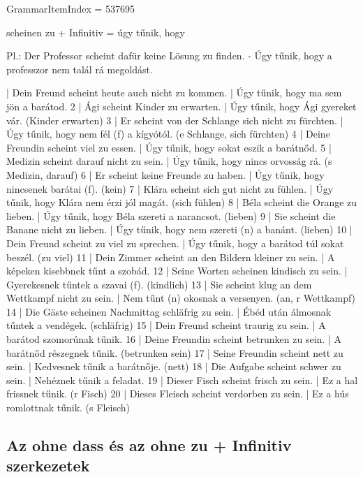 \documentclass{article}
\newenvironment{desc}{\verbatim}{\endverbatim}
\newenvironment{exmp}{\verbatim}{\endverbatim}
\begin{document}
GrammarItemIndex = 537695

\begin{desc}
scheinen zu + Infinitiv = úgy tűnik, hogy

Pl.: Der Professor scheint dafür keine Lösung zu finden. - Úgy tűnik, hogy a professzor nem talál rá megoldást.
\end{desc}

\begin{exmp}
1 | Dein Freund scheint heute auch nicht zu kommen. | Úgy tűnik, hogy ma sem jön a barátod.
2 | Ági scheint Kinder zu erwarten. | Úgy tűnik, hogy Ági gyereket vár. (Kinder erwarten)
3 | Er scheint von der Schlange sich nicht zu fürchten. | Úgy tűnik, hogy nem fél (f) a kígyótól. (e Schlange, sich fürchten)
4 | Deine Freundin scheint viel zu essen. | Úgy tűnik, hogy sokat eszik a barátnőd.
5 | Medizin scheint darauf nicht zu sein. | Úgy tűnik, hogy nincs orvosság rá. (s Medizin, darauf)
6 | Er scheint keine Freunde zu haben. | Úgy tűnik, hogy nincsenek barátai (f). (kein)
7 | Klára scheint sich gut nicht zu fühlen. | Úgy tűnik, hogy Klára nem érzi jól magát. (sich fühlen)
8 | Béla scheint die Orange zu lieben. | Úgy tűnik, hogy Béla szereti a narancsot. (lieben)
9 | Sie scheint die Banane nicht zu lieben. | Úgy tűnik, hogy nem szereti (n) a banánt. (lieben)
10 | Dein Freund scheint zu viel zu sprechen. | Úgy tűnik, hogy a barátod túl sokat beszél. (zu viel)
11 | Dein Zimmer scheint an den Bildern kleiner zu sein. | A képeken kisebbnek tűnt a szobád.
12 | Seine Worten scheinen kindisch zu sein. | Gyerekesnek tűntek a szavai (f). (kindlich)
13 | Sie scheint klug an dem Wettkampf nicht zu sein. | Nem tűnt (n) okosnak a versenyen. (an, r Wettkampf)
14 | Die Gäste scheinen Nachmittag schläfrig zu sein. | Ébéd után álmosnak tűntek a vendégek. (schläfrig)
15 | Dein Freund scheint traurig zu sein. | A barátod szomorúnak tűnik.
16 | Deine Freundin scheint betrunken zu sein. | A barátnőd részegnek tűnik. (betrunken sein)
17 | Seine Freundin scheint nett zu sein. | Kedvesnek tűnik a barátnője. (nett)
18 | Die Aufgabe scheint schwer zu sein. | Nehéznek tűnik a feladat.
19 | Dieser Fisch scheint frisch zu sein. | Ez a hal frissnek tűnik. (r Fisch)
20 | Dieses Fleisch scheint verdorben zu sein. | Ez a hús romlottnak tűnik. (s Fleisch)
\end{exmp}

\subsection{Az ohne dass és az ohne zu + Infinitiv szerkezetek}
\end{document}
